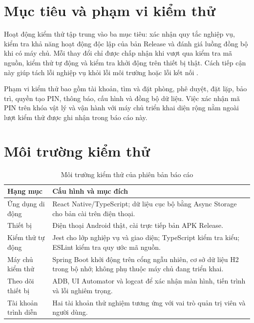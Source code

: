 \section{Mục tiêu và phạm vi kiểm thử}

Hoạt động kiểm thử tập trung vào ba mục tiêu: xác nhận quy tắc nghiệp vụ, kiểm tra khả năng hoạt động độc lập của bản Release và đánh giá luồng đồng bộ khi có máy chủ. Mỗi thay đổi chỉ được chấp nhận khi vượt qua kiểm tra mã nguồn, kiểm thử tự động và kiểm tra khởi động trên thiết bị thật. Cách tiếp cận này giúp tách lỗi nghiệp vụ khỏi lỗi môi trường hoặc lỗi kết nối \cite{istqb}.

Phạm vi kiểm thử bao gồm tài khoản, tìm và đặt phòng, phê duyệt, đặt lặp, bảo trì, quyền tạo PIN, thông báo, cấu hình và đồng bộ dữ liệu. Việc xác nhận mã PIN trên khóa vật lý và vận hành với máy chủ triển khai diện rộng nằm ngoài lượt kiểm thử được ghi nhận trong báo cáo này.

\section{Môi trường kiểm thử}

\begin{table}[H]
\centering
\caption{Môi trường kiểm thử của phiên bản báo cáo}
\label{tab:env}
\small
\begin{tabularx}{\textwidth}{>{\raggedright\arraybackslash}p{3.5cm}>{\raggedright\arraybackslash}X}
\toprule
\rowcolor{RoomHubLight}
\textbf{Hạng mục} & \textbf{Cấu hình và mục đích} \\
\midrule
Ứng dụng di động & React Native/TypeScript; dữ liệu cục bộ bằng Async Storage cho bản cài trên điện thoại. \\
Thiết bị & Điện thoại Android thật, cài trực tiếp bản APK Release. \\
Kiểm thử tự động & Jest cho lớp nghiệp vụ và giao diện; TypeScript kiểm tra kiểu; ESLint kiểm tra quy ước mã nguồn. \\
Máy chủ kiểm thử & Spring Boot khởi động trên cổng ngẫu nhiên, cơ sở dữ liệu H2 trong bộ nhớ; không phụ thuộc máy chủ đang triển khai. \\
Theo dõi thiết bị & ADB, UI Automator và logcat để xác nhận màn hình, tiến trình và lỗi nghiêm trọng. \\
Tài khoản trình diễn & Hai tài khoản thử nghiệm tương ứng với vai trò quản trị viên và người dùng. \\
\bottomrule
\end{tabularx}
\end{table}

